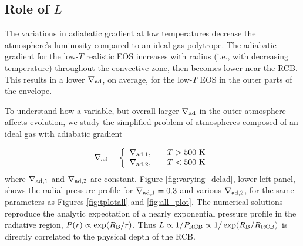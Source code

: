 \documentclass[apj]{emulateapj}
\newcommand{\delad}{\nabla_{\rm ad}}
\newcommand{\RB}{R_{\rm B}}
\newcommand{\cb}{_{\rm RCB}}
\begin{document}
\subsection{Role of $L$}


The variations in adiabatic gradient at low temperatures decrease the atmosphere's luminosity compared to an ideal gas polytrope. The adiabatic gradient for the low-$T$ realistic EOS increases with radius (i.e., with decreasing temperature) throughout the convective zone, then becomes lower near the RCB. This results in a lower $\delad$, on average, for the low-$T$ EOS in the outer parts of the envelope.


To understand how a variable, but overall larger $\delad$ in the outer atmosphere affects evolution, we study the simplified problem of atmospheres composed of an ideal gas with adiabatic gradient 

\begin{equation}
\label{eq:deladvar}
\delad = \left\{
\begin{array}{l l}
\nabla_{\rm ad, 1}, & \quad T > 500 \text{ K} \\
\nabla_{\rm ad, 2}, & \quad T < 500 \text{ K}
\end{array} 
\right.
\end{equation}   
where $\nabla_{\rm ad, 1}$ and $\nabla_{\rm ad,2}$ are constant. Figure \ref{fig:varying_delad}, lower-left panel, shows the radial pressure profile for $\nabla_{\rm ad,1}=0.3$ and various $\nabla_{\rm ad,2}$, for the same parameters as Figures \ref{fig:tplotall} and \ref{fig:all_plot}. The numerical solutions reproduce the analytic expectation of a nearly exponential pressure profile in the radiative region, $P(r) \propto \exp(\RB/r)$. Thus $L \propto 1/P\cb \propto 1/\exp(\RB/R\cb)$ is directly correlated to the physical depth of the RCB. 
\end{document}
